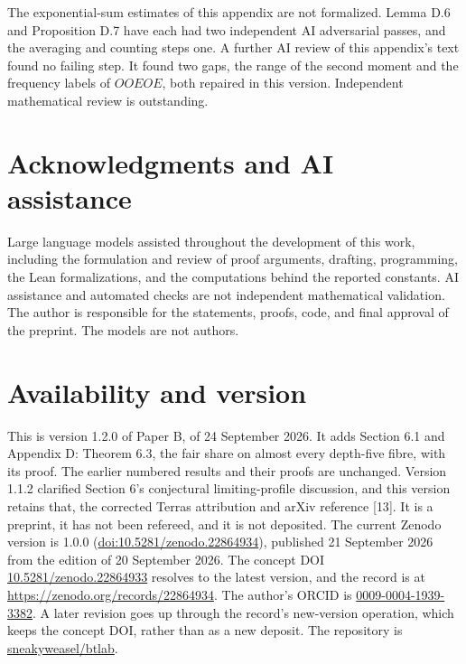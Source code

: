 \documentclass[11pt,a4paper]{article}
\begin{document}
The exponential-sum estimates of this appendix are not formalized. Lemma
D.6 and Proposition D.7 have each had two independent AI adversarial
passes, and the averaging and counting steps one. A further AI review of
this appendix's text found no failing step. It found two gaps, the range
of the second moment and the frequency labels of \(OOEOE\), both
repaired in this version. Independent mathematical review is
outstanding.


\section{Acknowledgments and AI
assistance}\label{acknowledgments-and-ai-assistance}

Large language models assisted throughout the development of this work,
including the formulation and review of proof arguments, drafting,
programming, the Lean formalizations, and the computations behind the
reported constants. AI assistance and automated checks are not
independent mathematical validation. The author is responsible for the
statements, proofs, code, and final approval of the preprint. The models
are not authors.

\section{Availability and version}\label{availability-and-version}

This is version 1.2.0 of Paper B, of 24 September 2026. It adds Section
6.1 and Appendix D: Theorem 6.3, the fair share on almost every
depth-five fibre, with its proof. The earlier numbered results and their
proofs are unchanged. Version 1.1.2 clarified Section 6's conjectural
limiting-profile discussion, and this version retains that, the
corrected Terras attribution and arXiv reference {[}13{]}. It is a
preprint, it has not been refereed, and it is not deposited. The current
Zenodo version is 1.0.0
(\href{https://doi.org/10.5281/zenodo.22864934}{doi:10.5281/zenodo.22864934}),
published 21 September 2026 from the edition of 20 September 2026. The
concept DOI
\href{https://doi.org/10.5281/zenodo.22864933}{10.5281/zenodo.22864933}
resolves to the latest version, and the record is at
\url{https://zenodo.org/records/22864934}. The author's ORCID is
\href{https://orcid.org/0009-0004-1939-3382}{0009-0004-1939-3382}. A
later revision goes up through the record's new-version operation, which
keeps the concept DOI, rather than as a new deposit. The repository is
\href{https://github.com/sneakyweasel/btlab}{sneakyweasel/btlab}.
\end{document}
